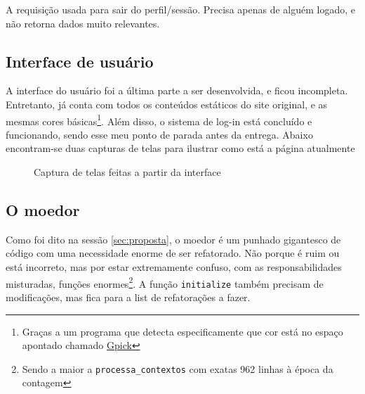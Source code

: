A requisição usada para sair do perfil/sessão. Precisa apenas de alguém logado, e não retorna dados muito relevantes.

\subsection{Interface de usuário}\label{subsec:gui}

A interface do usuário foi a última parte a ser desenvolvida, e ficou incompleta. Entretanto, já conta com todos os
conteúdos estáticos do site original, e as mesmas cores básicas\footnote{Graças a um programa que detecta especificamente
que cor está no espaço apontado chamado \href{http://www.gpick.org/}{Gpick}}. Além disso, o sistema de log-in está
concluído e funcionando, sendo esse meu ponto de parada antes da entrega. Abaixo encontram-se duas capturas de telas para
ilustrar como está a página atualmente

\begin{figure}[htb]
    \centering
    \caption{Captura de telas feitas a partir da interface}
    \label{fig:screenshots}
\end{figure}

\subsection{O moedor}\label{subsec:o-moedor}

Como foi dito na sessão \ref{sec:proposta}, o moedor é um punhado gigantesco de código com uma necessidade enorme de
ser refatorado. Não porque é ruim ou está incorreto, mas por estar extremamente confuso, com as responsabilidades
misturadas, funções enormes\footnote{Sendo a maior a \texttt{processa\_contextos} com exatas 962 linhas à época da
contagem}. A função \texttt{initialize} também precisam de modificações, mas fica para a list de refatorações a fazer.

